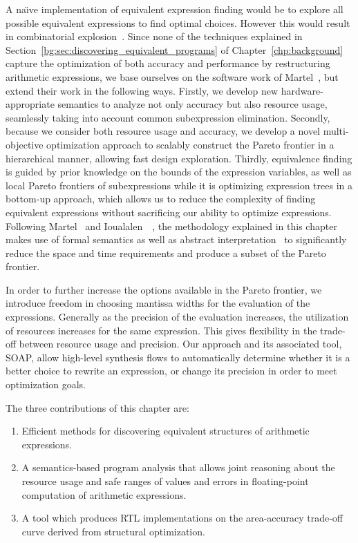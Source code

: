A na{\"\i}ve implementation of equivalent expression finding
would be to explore all possible equivalent expressions to find
optimal choices.  However this would result in combinatorial
explosion~\cite{ioualalen}.  Since none of the techniques explained
in Section~\ref{bg:sec:discovering_equivalent_programs} of
Chapter~\ref{chp:background} capture the optimization of both accuracy and
performance by restructuring arithmetic expressions, we base ourselves on the
software work of Martel~\cite{martel07}, but extend their work in the following
ways. Firstly, we develop new hardware-appropriate semantics to analyze not
only accuracy but also resource usage, seamlessly taking into account common
subexpression elimination. Secondly, because we consider both resource usage
and accuracy, we develop a novel multi-objective optimization approach to
scalably construct the Pareto frontier in a hierarchical manner, allowing fast
design exploration. Thirdly, equivalence finding is guided by prior knowledge
on the bounds of the expression variables, as well as local Pareto frontiers
of subexpressions while it is optimizing expression trees in a bottom-up
approach, which allows us to reduce the complexity of finding equivalent
expressions without sacrificing our ability to optimize expressions.  Following
Martel~\cite{martel07} and Ioualalen~\etal~\cite{ioualalen}, the methodology
explained in this chapter makes use of formal semantics as well as abstract
interpretation~\cite{cousot77} to significantly reduce the space and time
requirements and produce a subset of the Pareto frontier.

In order to further increase the options available in the Pareto frontier,
we introduce freedom in choosing mantissa widths for the evaluation of the
expressions. Generally as the precision of the evaluation increases, the
utilization of resources increases for the same expression. This gives
flexibility in the trade-off between resource usage and precision. Our
approach and its associated tool, SOAP, allow high-level synthesis flows to
automatically determine whether it is a better choice to rewrite an expression,
or change its precision in order to meet optimization goals.

The three contributions of this chapter are:
\begin{enumerate}
    \item Efficient methods for discovering equivalent structures of
    arithmetic expressions.
    \item A semantics-based program analysis that allows joint reasoning about
    the resource usage and safe ranges of values and errors in floating-point
    computation of arithmetic expressions.
    \item A tool which produces RTL implementations on the area-accuracy
    trade-off curve derived from structural optimization.
\end{enumerate}


